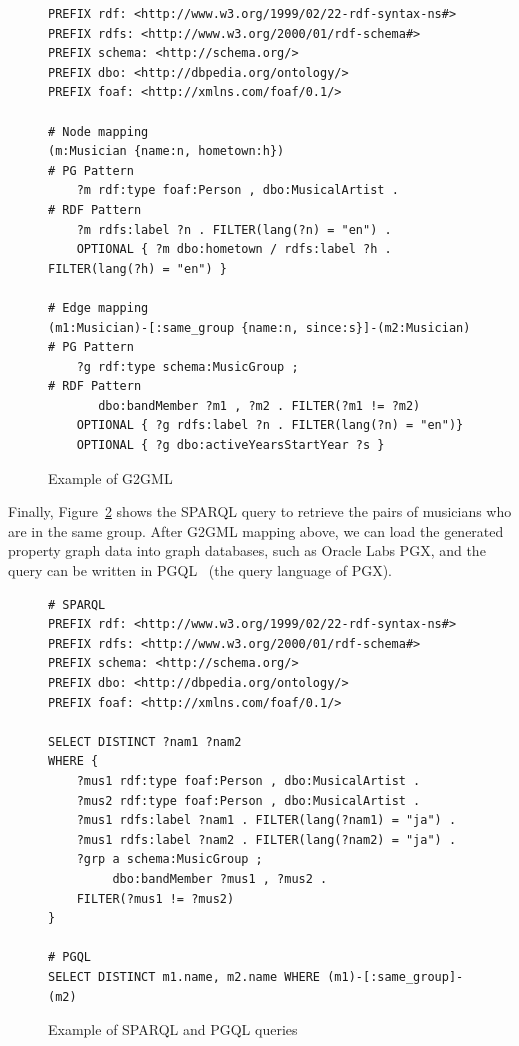\documentclass[runningheads]{llncs}
\begin{document}
\begin{figure}[!t]
\vspace{2mm}
\begin{scriptsize}
\begin{verbatim}
PREFIX rdf: <http://www.w3.org/1999/02/22-rdf-syntax-ns#>
PREFIX rdfs: <http://www.w3.org/2000/01/rdf-schema#>
PREFIX schema: <http://schema.org/>
PREFIX dbo: <http://dbpedia.org/ontology/>
PREFIX foaf: <http://xmlns.com/foaf/0.1/>

# Node mapping
(m:Musician {name:n, hometown:h})                            # PG Pattern
    ?m rdf:type foaf:Person , dbo:MusicalArtist .            # RDF Pattern
    ?m rdfs:label ?n . FILTER(lang(?n) = "en") .
    OPTIONAL { ?m dbo:hometown / rdfs:label ?h . FILTER(lang(?h) = "en") }

# Edge mapping
(m1:Musician)-[:same_group {name:n, since:s}]-(m2:Musician)  # PG Pattern
    ?g rdf:type schema:MusicGroup ;                          # RDF Pattern
       dbo:bandMember ?m1 , ?m2 . FILTER(?m1 != ?m2)
    OPTIONAL { ?g rdfs:label ?n . FILTER(lang(?n) = "en")}
    OPTIONAL { ?g dbo:activeYearsStartYear ?s }
\end{verbatim}
\end{scriptsize}
\caption{Example of G2GML}
\label{fig:g2gml}
\end{figure}

Finally, Figure~\ref{fig:sparql} shows the SPARQL query to retrieve the pairs of musicians who are in the same group. After G2GML mapping above, we can load the generated property graph data into graph databases, such as Oracle Labs PGX, and the query can be written in PGQL~\cite{pgql} (the query language of PGX).

\begin{figure}[!t]
\vspace{2mm}
\begin{scriptsize}
\begin{verbatim}
# SPARQL
PREFIX rdf: <http://www.w3.org/1999/02/22-rdf-syntax-ns#>
PREFIX rdfs: <http://www.w3.org/2000/01/rdf-schema#>
PREFIX schema: <http://schema.org/>
PREFIX dbo: <http://dbpedia.org/ontology/>
PREFIX foaf: <http://xmlns.com/foaf/0.1/>

SELECT DISTINCT ?nam1 ?nam2
WHERE {
    ?mus1 rdf:type foaf:Person , dbo:MusicalArtist .
    ?mus2 rdf:type foaf:Person , dbo:MusicalArtist .
    ?mus1 rdfs:label ?nam1 . FILTER(lang(?nam1) = "ja") .
    ?mus1 rdfs:label ?nam2 . FILTER(lang(?nam2) = "ja") .
    ?grp a schema:MusicGroup ;
         dbo:bandMember ?mus1 , ?mus2 .
    FILTER(?mus1 != ?mus2)
}

# PGQL
SELECT DISTINCT m1.name, m2.name WHERE (m1)-[:same_group]-(m2)
\end{verbatim}
\end{scriptsize}
\caption{Example of SPARQL and PGQL queries}
\label{fig:sparql}
\end{figure}
\end{document}
